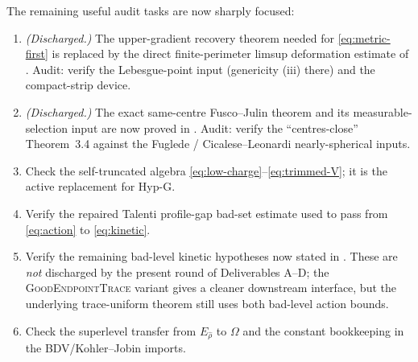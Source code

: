 \documentclass[11pt]{article}
\theoremstyle{definition}
\newcommand{\Om}{\Omega}
\newcommand{\rhad}{\widehat\rho}
\begin{document}
The remaining useful audit tasks are now sharply focused:
\begin{enumerate}
\item \emph{(Discharged.)} The upper-gradient recovery theorem needed
for \eqref{eq:metric-first} is replaced by the direct finite-perimeter
limsup deformation estimate of
\cite[Thm.~1.1]{LimsupDeformation}.  Audit: verify the Lebesgue-point
input (genericity (iii) there) and the compact-strip device.
\item \emph{(Discharged.)} The exact same-centre Fusco--Julin theorem
and its measurable-selection input are now proved in
\cite[Thms.~3.6, 4.2]{SameCentreFJ}.  Audit: verify the
``centres-close'' Theorem~3.4 against the Fuglede / Cicalese--Leonardi
nearly-spherical inputs.
\item Check the self-truncated algebra
\eqref{eq:low-charge}--\eqref{eq:trimmed-V}; it is the active
replacement for Hyp-G.
\item Verify the repaired Talenti profile-gap bad-set estimate used to
pass from \eqref{eq:action} to \eqref{eq:kinetic}.
\item Verify the remaining bad-level kinetic hypotheses now stated in
\cite[Hyp.~3.6]{WeightedMetricTrace}.  These are \emph{not} discharged
by the present round of Deliverables A--D; the
\textsc{GoodEndpointTrace} variant gives a cleaner downstream
interface, but the underlying trace-uniform theorem still uses both
bad-level action bounds.
\item Check the superlevel transfer from $E_{\rhad}$ to $\Om$ and the
constant bookkeeping in the BDV/Kohler--Jobin imports.
\end{enumerate}
\end{document}
